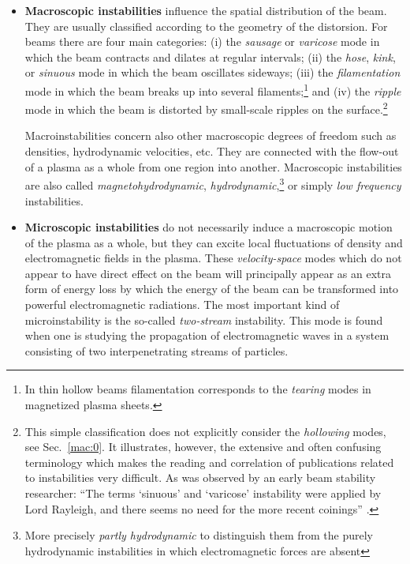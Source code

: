 \documentclass [12pt,a4paper,     ]{report} %
\begin{document}
\begin{itemize}

   \item {\bf Macroscopic instabilities} influence the spatial distribution of the beam.  They are usually classified according to the geometry of the distorsion.  For beams there are four main categories: (i) the \emph{sausage} or \emph{varicose} mode in which the beam contracts and dilates at regular intervals; (ii) the \emph{hose}, \emph{kink}, or \emph{sinuous} mode in which the beam oscillates sideways; (iii) the \emph{filamentation} mode in which the beam breaks up into several filaments;\footnote{In thin hollow beams filamentation corresponds to the \emph{tearing} modes in magnetized plasma sheets.} and (iv) the \emph{ripple} mode in which the beam is distorted by small-scale ripples on the surface.\footnote{This simple classification does not explicitly consider the \emph{hollowing} modes, see Sec.~\ref{mac:0}.  It illustrates, however, the extensive and often confusing terminology which makes the reading and correlation of publications related to instabilities very difficult.  As was observed by an early beam stability researcher:  
``The terms `sinuous' and `varicose' instability were applied by Lord Rayleigh, and there seems no need for the more recent coinings'' \cite[p.225]{FINKE1961-}.}

Macroinstabilities concern also other macroscopic degrees of freedom such as densities, hydrodynamic velocities, etc.  They are connected with the flow-out of a plasma as a whole from one region into another.  Macroscopic instabilities are also called \emph{magnetohydrodynamic}, \emph{hydrodynamic},\footnote{More precisely \emph{partly hydrodynamic} to distinguish them from the purely hydrodynamic instabilities in which electromagnetic forces are absent} or simply \emph{low frequency} instabilities.

   \item {\bf Microscopic instabilities} do not necessarily induce a macroscopic motion of the plasma as a whole, but they can excite local fluctuations of density and electromagnetic fields in the plasma.  These \emph{velocity-space} modes which do not appear to have direct effect on the beam will principally appear as an extra form of energy loss by which the energy of the beam can be transformed into powerful electromagnetic radiations.  The most important kind of microinstability is the so-called \emph{two-stream} instability.  This mode is found when one is studying the propagation of electromagnetic waves in a system consisting of two interpenetrating streams of particles.


\end{itemize}
\end{document}
